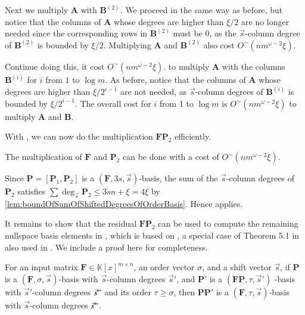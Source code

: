 \begin{pf}
Next we multiply $\mathbf{A}$ with $\mathbf{B}^{(2)}$. We proceed
in the same way as before, but notice that the columns of $\mathbf{A}$
whose degrees are higher than $\xi/2$ are no longer needed since
the corresponding rows in $\mathbf{B}^{(2)}$ must be 0, as the $\vec{s}$-column
degree of $\mathbf{B}^{(2)}$ is bounded by $\xi/2$. Multiplying
$\mathbf{A}$ and $\mathbf{B}^{(2)}$ also cost $O^{\sim}\left(nm^{\omega-2}\xi\right)$.

Continue doing this, it cost $O^{\sim}\left(nm^{\omega-2}\xi\right)$.
to multiply $\mathbf{A}$ with the columns $\mathbf{B}^{(i)}$ for
$i$ from $1$ to $\log m$.  As before, notice that the columns of
$\mathbf{A}$ whose degrees are higher than $\xi/2^{i-1}$ are not
needed, as $\vec{s}$-column degrees of $\mathbf{B}^{(i)}$ is bounded
by $\xi/2^{i-1}$. The overall cost for $i$ from 1 to $\log m$ is
$O^{\sim}\left(nm^{\omega-2}\xi\right)$ to multiply $\mathbf{A}$
and $\mathbf{B}$. 
\end{pf}
With , we can now do the
multiplication $\mathbf{F}\mathbf{P}_{2}$ efficiently.
\begin{cor}
\label{cor:multiplyingFP2}The multiplication of $\mathbf{F}$ and
$\mathbf{P}_{2}$ can be done with a cost of $O^{\sim}\left(nm^{\omega-2}\xi\right)$.\end{cor}
\begin{pf}
Since $\mathbf{P}=[\mathbf{P}_{1},\mathbf{P}_{2}]$ is a $(\mathbf{F},3s,\vec{s})$-basis,
the sum of the $\vec{s}$-column degrees of $\mathbf{P}_{2}$ satisfies
$\sum\deg_{\vec{s}}\mathbf{P}_{2}\le3sn+\xi=4\xi$ by \ref{lem:boundOfSumOfShiftedDegreesOfOrderBasis}.
Hence  applies.
\end{pf}
It remains to show that the residual $\mathbf{F}\mathbf{P}_{2}$ can
be used to compute the remaining nullspace basis elements in ,
which is based on , a
special case of Theorem 5.1 in \citep{BL1997}\textbf{ }also used
in \citep{za2009}. We include a proof here for completeness.
\begin{lem}
\label{lem:continueComputingOrderBasis}For an input matrix $\mathbf{F}\in\mathbb{K}\left[x\right]^{m\times n}$,
an order vector $\sigma$, and a shift vector $\vec{s}$, if $\mathbf{P}$
is a $\left(\mathbf{F},\sigma,\vec{s}\right)$-basis with $\vec{s}$-column
degrees $\vec{s}'$, and $\mathbf{P}'$ is a $(\mathbf{F}\mathbf{P},\tau,\vec{s}')$
-basis with $\vec{s}'$-column degrees $\vec{s}"$ and its order $\tau\ge\sigma$,
then $\mathbf{P}\mathbf{P}'$ is a $(\mathbf{F},\tau,\vec{s})$-basis
with $\vec{s}$-column degrees $\vec{s}"$.\end{lem}
